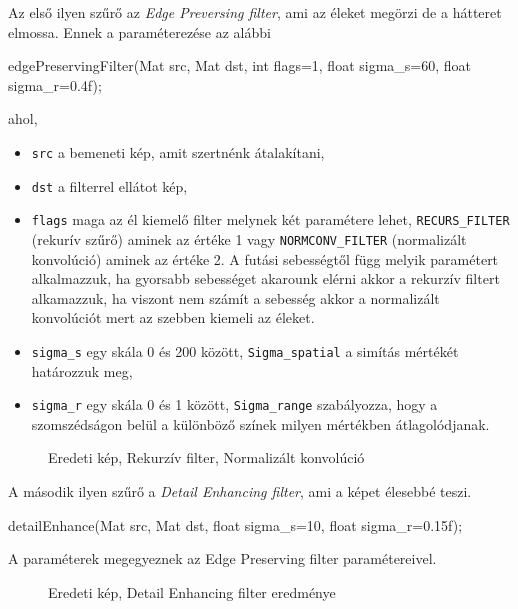 Az első ilyen szűrő az \textit{Edge Preversing filter}, ami az éleket megörzi de a hátteret elmossa. 
Ennek a paraméterezése az alábbi
\begin{cpp}
edgePreservingFilter(Mat src, Mat dst, int flags=1, 
			float sigma_s=60, float sigma_r=0.4f);
\end{cpp}
ahol,
\begin{itemize}
    \item \texttt{src} a bemeneti kép, amit szertnénk átalakítani,
    \item \texttt{dst} a filterrel ellátot kép,
    \item \texttt{flags} maga az él kiemelő filter melynek két paramétere lehet, \texttt{RECURS\_FILTER} (rekurív szűrő) aminek az értéke 1 vagy \texttt{NORMCONV\_FILTER} (normalizált konvolúció) aminek az értéke 2.  A futási sebességtől függ melyik paramétert alkalmazzuk, ha gyorsabb sebességet akarounk elérni akkor a rekurzív filtert alkamazzuk, ha viszont nem számít a sebesség akkor a  normalizált konvolúciót mert az szebben kiemeli az éleket.
    \item \texttt{sigma\_s} egy skála 0 és 200 között, \texttt{Sigma\_spatial} a simítás mértékét határozzuk meg,
    \item \texttt{sigma\_r} egy skála 0 és 1 között, \texttt{Sigma\_range} szabályozza, hogy a szomszédságon belül a különböző színek milyen mértékben átlagolódjanak.
\end{itemize}

\begin{figure}[ht]
\centering
{}
\caption{Eredeti kép, Rekurzív filter, Normalizált konvolúció} 
\label{fig:edgePreservingFilter}
\end{figure}


A második ilyen szűrő a \textit{Detail Enhancing filter}, ami a képet élesebbé teszi.
\begin{cpp}
detailEnhance(Mat src, Mat dst, float sigma_s=10, float sigma_r=0.15f);
\end{cpp}

A paraméterek megegyeznek az Edge Preserving filter paramétereivel. 

\begin{figure}[ht]
\centering
{}
\caption{Eredeti kép, Detail Enhancing filter eredménye} 
\label{fig:detailEnhance}
\end{figure}

